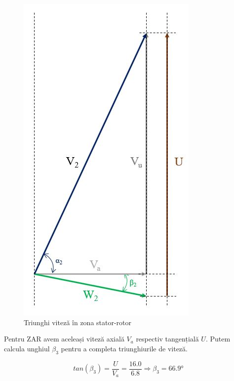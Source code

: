 \begin{figure}[h!]
	\centering
	\includegraphics[scale=0.4]{figures/triunghi_viteza_ZSR.jpg}
	\caption{Triunghi viteză în zona stator-rotor}
	\label{Triunghi viteză în zona stator-rotor}
\end{figure}

\clearpage

Pentru ZAR avem aceleași viteză axială $V_a$ respectiv tangențială $U$. Putem calcula unghiul $\beta_3$ pentru a completa triunghiurile de viteză.

\begin{equation}
tan(\beta_{3})=\frac{U}{V_a} = \frac{16.0}{6.8} \Rightarrow \beta_{3} =66.9\si{\degree}
\end{equation}


